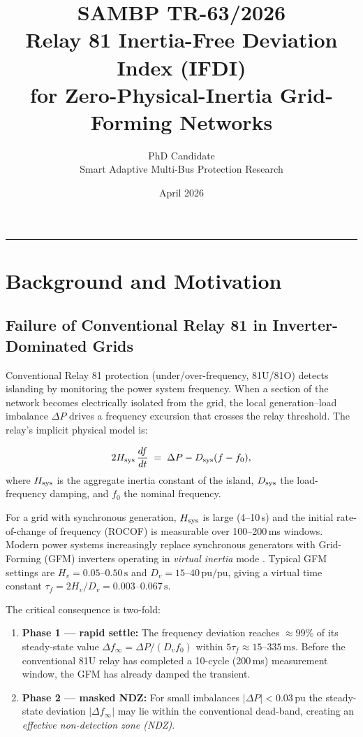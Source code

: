 \documentclass[11pt, a4paper]{article}
\title{\textbf{SAMBP TR-63/2026}\\[4pt]
       \large Relay 81 Inertia-Free Deviation Index (IFDI)\\
       for Zero-Physical-Inertia Grid-Forming Networks}
\author{PhD Candidate\\[2pt]
        \small Smart Adaptive Multi-Bus Protection Research}
\date{April 2026}
\begin{document}
\maketitle
\tableofcontents
\vspace{6pt}\hrule\vspace{10pt}

\section{Background and Motivation}
\label{sec:background}

\subsection{Failure of Conventional Relay 81 in Inverter-Dominated Grids}

Conventional Relay 81 protection (under/over-frequency, 81U/81O) detects
islanding by monitoring the power system frequency.  When a section of the
network becomes electrically isolated from the grid, the local
generation–load imbalance $\Delta P$ drives a frequency excursion that
crosses the relay threshold.  The relay's implicit physical model is:

\begin{equation}
  2H_{\rm sys}\,\frac{df}{dt} \;=\; \Delta P - D_{\rm sys}(f - f_0),
  \label{eq:swing}
\end{equation}
where $H_{\rm sys}$ is the aggregate inertia constant of the island,
$D_{\rm sys}$ the load-frequency damping, and $f_0$ the nominal frequency.

For a grid with synchronous generation, $H_{\rm sys}$ is large (4--10\,s) and
the initial rate-of-change of frequency (ROCOF) is measurable over
100--200\,ms windows.  Modern power systems increasingly replace synchronous
generators with Grid-Forming (GFM) inverters operating in \emph{virtual
inertia} mode \cite{Milano2018, Rocabert2012}.  Typical GFM settings are $H_v = 0.05$--$0.50\,\text{s}$ and
$D_v = 15$--$40\,\text{pu/pu}$, giving a virtual time constant
$\tau_f = 2H_v/D_v = 0.003$--$0.067\,\text{s}$.

The critical consequence is two-fold:
\begin{enumerate}
  \item \textbf{Phase 1 — rapid settle:}  The frequency deviation reaches
    $\approx 99\%$ of its steady-state value $\Delta f_\infty = \Delta P /
    (D_v f_0)$ within $5\tau_f \approx 15$--$335\,\text{ms}$.  Before the
    conventional 81U relay has completed a 10-cycle (200\,ms) measurement
    window, the GFM has already damped the transient.

  \item \textbf{Phase 2 — masked NDZ:}  For small imbalances $|\Delta P| <
    0.03\,\text{pu}$ the steady-state deviation $|\Delta f_\infty|$ may lie
    within the conventional dead-band, creating an
    \emph{effective non-detection zone (NDZ)}.
\end{enumerate}
\end{document}
